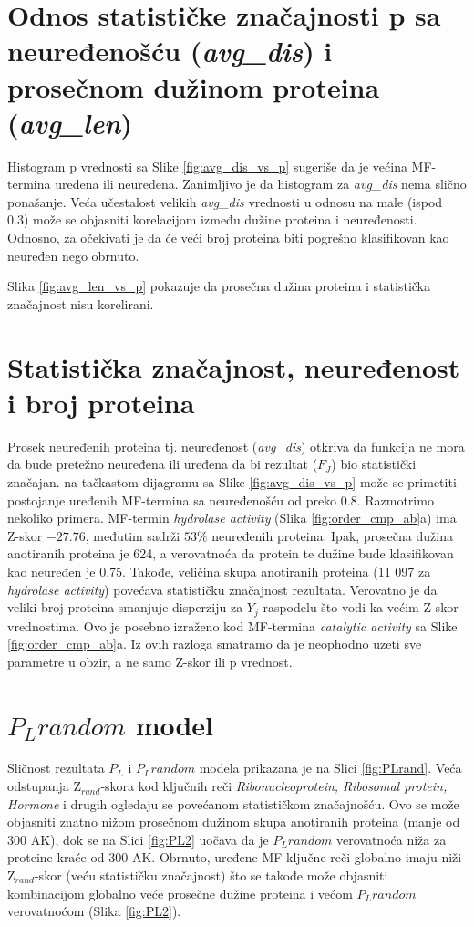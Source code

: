 \section{Odnos statističke značajnosti p sa neuređenošću (\textit{avg\_dis}) i prosečnom dužinom proteina (\textit{avg\_len}) }

Histogram p vrednosti sa Slike \ref{fig:avg_dis_vs_p} sugeriše da je većina
MF-termina uređena ili neuređena. Zanimljivo je da histogram za
\textit{avg\_dis} nema slično ponašanje. Veća učestalost velikih
\textit{avg\_dis} vrednosti u odnosu na male (ispod 0.3) može se objasniti
korelacijom između dužine proteina i neuređenosti. Odnosno, za očekivati je da
će veći broj proteina biti pogrešno klasifikovan kao neuređen nego obrnuto.

Slika \ref{fig:avg_len_vs_p} pokazuje da prosečna dužina proteina 
i statistička značajnost nisu korelirani. 

\section{Statistička značajnost, neuređenost i broj proteina}

Prosek neuređenih proteina tj. neuređenost  (\textit{avg\_dis}) otkriva da
funkcija ne mora da bude pretežno neuređena ili uređena da bi rezultat ($F_J$)
bio statistički značajan. na tačkastom dijagramu sa
Slike \ref{fig:avg_dis_vs_p} može se primetiti postojanje uređenih
MF-termina sa neuređenošću od preko 0.8.  Razmotrimo nekoliko primera.
MF-termin \textit{hydrolase activity} (Slika \ref{fig:order_cmp_ab}a) ima
Z-skor $-27.76$, međutim sadrži $53\%$ neuređenih proteina. Ipak, prosečna
dužina anotiranih proteina je 624, a verovatnoća da protein te dužine bude
klasifikovan kao neuređen je 0.75.  Takođe, veličina skupa anotiranih proteina
(11 097 za \textit{hydrolase activity}) povećava statističku značajnost
rezultata. Verovatno je da veliki broj proteina smanjuje disperziju za $Y_j$
raspodelu što vodi ka većim Z-skor vrednostima.  Ovo je posebno izraženo kod
MF-termina \textit{catalytic activity} sa Slike \ref{fig:order_cmp_ab}a.  Iz
ovih razloga smatramo da je neophodno uzeti sve parametre u obzir, a ne samo
Z-skor ili p vrednost.

\section{$P_Lrandom$ model}

Sličnost rezultata $P_L$ i $P_L random$ modela prikazana je na Slici
\ref{fig:PLrand}. Veća odstupanja Z$_{rand}$-skora kod ključnih reči
\textit{Ribonucleoprotein, Ribosomal protein, Hormone} i drugih ogledaju se
povećanom statističkom značajnošću. Ovo se može objasniti znatno
nižom prosečnom dužinom skupa anotiranih proteina (manje od 300 AK), dok se na
Slici \ref{fig:PL2} uočava da je $P_L random$ verovatnoća niža za proteine
kraće od 300 AK.  Obrnuto, uređene MF-ključne reči globalno imaju niži
Z$_{rand}$-skor (veću statističku značajnost) što se takođe može objasniti
kombinacijom globalno veće prosečne dužine proteina i većom $P_L random$
verovatnoćom (Slika \ref{fig:PL2}). 

